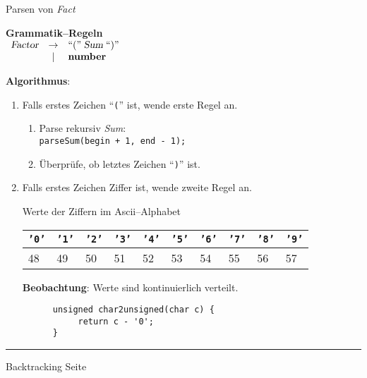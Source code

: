 \begin{slide}{}
\normalsize

\begin{center}
Parsen von \textsl{Fact}
\end{center}
\vspace*{0.5cm}

\footnotesize
\textbf{Grammatik--Regeln} \\[0.3cm]
\hspace*{1.3cm} 
$\begin{array}{lcl}
         \textsl{Factor} & \rightarrow & ``\mathtt{(}\cq \;\textsl{Sum}\; ``\mathtt{)}\cq   \\
                         & |           & \mathbf{number}                                    \\
 \end{array}$

\textbf{Algorithmus}:
\begin{enumerate}
\item Falls erstes Zeichen ``\texttt{(}'' ist, wende erste Regel an.
      \begin{enumerate}
      \item Parse rekursiv \textsl{Sum}: \\[0.3cm]
            \hspace*{1.3cm} \texttt{parseSum(begin + 1, end - 1);}
      \item Überpr\"ufe, ob letztes Zeichen ``\texttt{)}'' ist.
      \end{enumerate}
\item Falls erstes Zeichen Ziffer ist, wende zweite Regel an.
    
      Werte der Ziffern im {\sc Ascii}--Alphabet \\[0.8cm]
\hspace*{-1.3cm} 
      \begin{tabular}{|l|l|l|l|l|l|l|l|l|l|}
      \hline
          \texttt{'0'} & \texttt{'1'} &\texttt{'2'} &\texttt{'3'} &\texttt{'4'} &\texttt{'5'} &\texttt{'6'} &\texttt{'7'} &\texttt{'8'} &\texttt{'9'} \\
      \hline
          48 & 49 & 50 & 51 & 52 & 53 & 54 & 55 & 56 & 57 \\
      \hline
      \end{tabular}
      \vspace*{0.8cm}

      \textbf{Beobachtung}: Werte sind kontinuierlich verteilt. 
      \begin{verbatim}
      unsigned char2unsigned(char c) {
           return c - '0';
      }
      \end{verbatim}
\end{enumerate}

\vspace*{\fill}
\tiny \addtocounter{mypage}{1}
\rule{17cm}{1mm}
Backtracking  \hspace*{\fill} Seite 
\end{slide}

